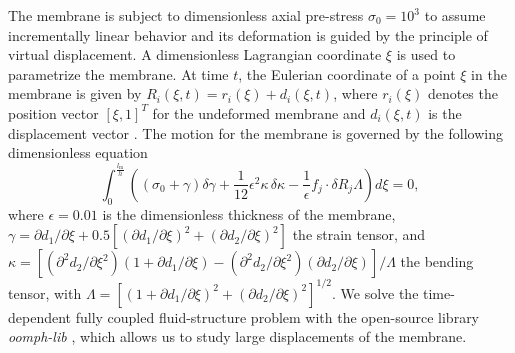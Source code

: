 \documentclass[aps,prl,reprint,superscriptaddress,floatfix]{revtex4-1}
\begin{document}
The membrane is subject to dimensionless axial pre-stress $ \sigma_0 =10^3$ to assume incrementally linear behavior and its deformation is guided by the principle of virtual displacement. A dimensionless Lagrangian coordinate $\xi$ is used to parametrize the membrane. At time $t$, the Eulerian coordinate of a point $\xi$ in the membrane is given by $R_i(\xi,t) = r_i(\xi) + d_i(\xi,t)$, where  $r_i(\xi)$ denotes the position vector $[\xi, 1]^T$ for the undeformed membrane and $d_i(\xi,t)$ is the displacement vector \citep{Jensen03}. The motion for the membrane is governed by the following dimensionless equation
\begin{equation}
\label{eq:virtualdisplacement}
\int_{0}^{\frac{l_\text{m}}{h}} \left((\sigma_0 + \gamma)\delta \gamma + \frac{1}{12}\epsilon^2\kappa \,\delta\kappa - \frac{1}{\epsilon}{f_j} \cdot\delta {R}_j \Lambda\right) d\xi = 0,
\end{equation}
where $\epsilon=0.01$ is the dimensionless thickness of the membrane, $\gamma=\partial d_1/\partial {\xi} + 0.5[(\partial d_1/\partial {\xi})^2 + (\partial d_2/\partial {\xi})^2]$  the strain tensor, and $\kappa = [(\partial^2 d_2/\partial {\xi^2})(1+\partial d_1/\partial {\xi}) - (\partial^2 d_2/\partial {{\xi}^2}) (\partial d_2/\partial {\xi})]/\Lambda$  the bending tensor, with $\Lambda=[(1+\partial d_1/\partial \xi)^2+(\partial d_2/\partial {\xi})^2]^{1/2}$. We solve the time-dependent fully coupled fluid-structure problem with the open-source library \emph{oomph-lib} \cite{OOmph,heil2006}, which allows us to study large displacements of the membrane. 
\end{document}
